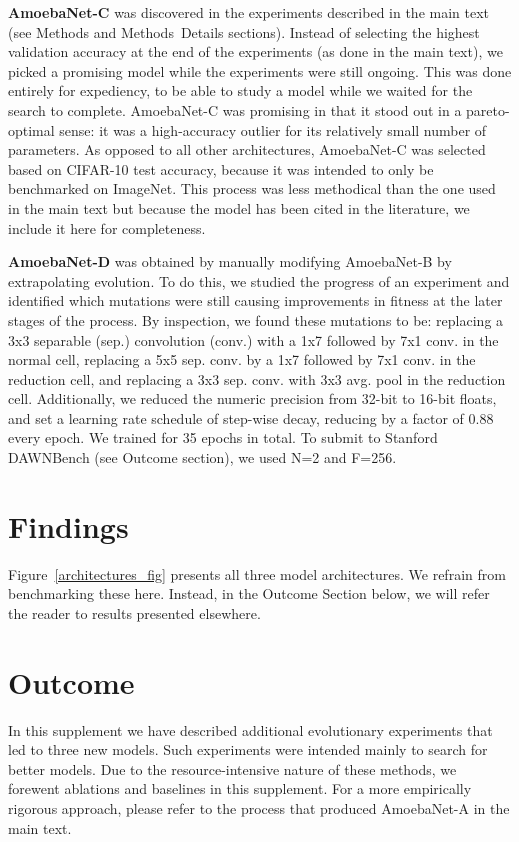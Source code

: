 \documentclass[letterpaper]{article} \usepackage{aaai19}  \usepackage{times}  \usepackage{helvet}  \usepackage{courier}  \usepackage{graphicx}  \frenchspacing
\begin{document}
\mbox{\textbf{AmoebaNet-C}} was discovered in the experiments described in the main text (see Methods and \mbox{Methods Details} sections). Instead of selecting the highest validation accuracy at the end of the experiments (as done in the main text), we picked a promising model while the experiments were still ongoing. This was done entirely for expediency, to be able to study a model while we waited for the search to complete. \mbox{AmoebaNet-C} was promising in that it stood out in a pareto-optimal sense: it was a high-accuracy outlier for its relatively small number of parameters. As opposed to all other architectures, AmoebaNet-C was selected based on CIFAR-10 test accuracy, because it was intended to only be benchmarked on ImageNet. This process was less methodical than the one used in the main text but because the model has been cited in the literature, we include it here for completeness.

\mbox{\textbf{AmoebaNet-D}} was obtained by manually modifying \mbox{AmoebaNet-B} by extrapolating evolution. To do this, we studied the progress of an experiment and identified which mutations were still causing improvements in fitness at the later stages of the process. By inspection, we found these mutations to be: replacing a 3x3 separable (sep.) convolution (conv.) with a 1x7 followed by 7x1 conv. in the normal cell, replacing a 5x5 sep. conv. by a 1x7 followed by 7x1 conv. in the reduction cell, and replacing a 3x3 sep. conv. with 3x3 avg. pool in the reduction cell. Additionally, we reduced the numeric precision from 32-bit to 16-bit floats, and set a learning rate schedule of step-wise decay, reducing by a factor of 0.88 every epoch. We trained for 35 epochs in total. To submit to Stanford DAWNBench (see Outcome section), we used N=2 and F=256.


\section{Findings}


Figure~\ref{architectures_fig} presents all three model architectures. We refrain from benchmarking these here. Instead, in the Outcome Section below, we will refer the reader to results presented elsewhere.


\section{Outcome}


In this supplement we have described additional evolutionary experiments that led to three new models. Such experiments were intended mainly to search for better models. Due to the resource-intensive nature of these methods, we forewent ablations and baselines in this supplement. For a more empirically rigorous approach, please refer to the process that produced \mbox{AmoebaNet-A} in the main text.
\end{document}
